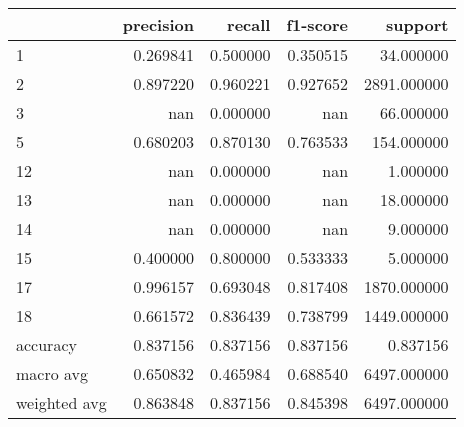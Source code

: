 \begin{tabular}{lrrrr}
\toprule
 & precision & recall & f1-score & support \\
\midrule
1 & 0.269841 & 0.500000 & 0.350515 & 34.000000 \\
2 & 0.897220 & 0.960221 & 0.927652 & 2891.000000 \\
3 & nan & 0.000000 & nan & 66.000000 \\
5 & 0.680203 & 0.870130 & 0.763533 & 154.000000 \\
12 & nan & 0.000000 & nan & 1.000000 \\
13 & nan & 0.000000 & nan & 18.000000 \\
14 & nan & 0.000000 & nan & 9.000000 \\
15 & 0.400000 & 0.800000 & 0.533333 & 5.000000 \\
17 & 0.996157 & 0.693048 & 0.817408 & 1870.000000 \\
18 & 0.661572 & 0.836439 & 0.738799 & 1449.000000 \\
accuracy & 0.837156 & 0.837156 & 0.837156 & 0.837156 \\
macro avg & 0.650832 & 0.465984 & 0.688540 & 6497.000000 \\
weighted avg & 0.863848 & 0.837156 & 0.845398 & 6497.000000 \\
\bottomrule
\end{tabular}
